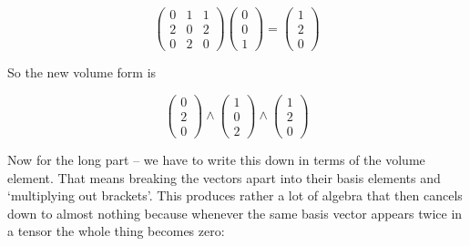 \documentclass[oneside,english]{amsbook}
\numberwithin{section}{chapter}
\theoremstyle{plain}
\theoremstyle{definition}
\begin{document}
\[\begin{pmatrix}
	0 & 1 & 1 \\
	2 & 0 & 2 \\
	0 & 2 & 0
\end{pmatrix}\begin{pmatrix}
	0 \\
	0 \\
	1
\end{pmatrix} = \begin{pmatrix}
	1 \\
	2 \\
	0
\end{pmatrix}\]

So the new volume form is

\[\begin{pmatrix}
	0 \\
	2 \\
	0
\end{pmatrix} \land \begin{pmatrix}
	1 \\
	0 \\
	2
\end{pmatrix} \land \begin{pmatrix}
	1 \\
	2 \\
	0
\end{pmatrix}\]

Now for the long part -- we have to write this down in terms of the
volume element. That means breaking the vectors apart into their basis
elements and `multiplying out brackets'. This produces rather a lot of
algebra that then cancels down to almost nothing because whenever the
same basis vector appears twice in a tensor the whole thing becomes
zero:
\end{document}
